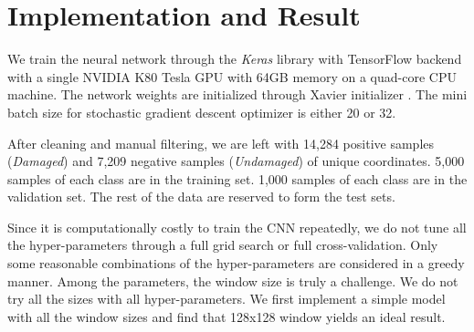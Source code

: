 \documentclass[journal, 12pt, onecolumn,draftclsnofoot]{IEEEtran}
\begin{document}





\section{Implementation and Result}\label{sec:case_study}
We train the neural network through the \textit{Keras} library with TensorFlow backend with a single NVIDIA K80 Tesla GPU with 64GB memory on a quad-core CPU machine. The network weights are initialized through Xavier initializer \cite{xavier}. The mini batch size for stochastic gradient descent optimizer is either 20 or 32.

After cleaning and manual filtering, we are left with 14,284 positive samples (\textit{Damaged}) and 7,209 negative samples (\textit{Undamaged}) of unique coordinates. 5,000 samples of each class are in the training set. 1,000 samples of each class are in the validation set. The rest of the data are reserved to form the test sets. 

Since it is computationally costly to train the CNN repeatedly, we do not tune all the hyper-parameters through a full grid search or full cross-validation. Only some reasonable combinations of the hyper-parameters are considered in a greedy manner. Among the parameters, the window size is truly a challenge. We do not try all the sizes with all hyper-parameters. We first implement a simple model with all the window sizes and find that 128x128 window yields an ideal result. 
\end{document}
